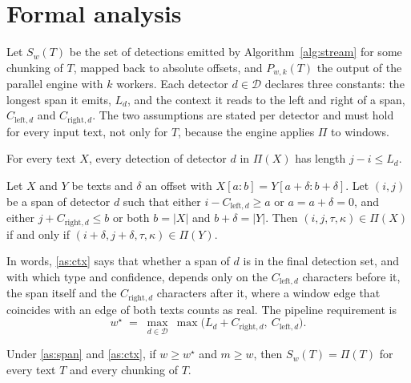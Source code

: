 \section{Formal analysis}\label{sec:formal}

Let $S_w(T)$ be the set of detections emitted by Algorithm~\ref{alg:stream} for some chunking of $T$, mapped back to absolute offsets, and $P_{w,k}(T)$ the output of the parallel engine with $k$ workers. Each detector $d \in \mathcal{D}$ declares three constants: the longest span it emits, $L_d$, and the context it reads to the left and right of a span, $C_{\mathrm{left},d}$ and $C_{\mathrm{right},d}$. The two assumptions are stated per detector and must hold for every input text, not only for $T$, because the engine applies $\Pi$ to windows.

\begin{assumption}\label{as:span}
For every text $X$, every detection of detector $d$ in $\Pi(X)$ has length $j - i \le L_d$.
\end{assumption}

\begin{assumption}\label{as:ctx}
Let $X$ and $Y$ be texts and $\delta$ an offset with $X[a{:}b] = Y[a{+}\delta : b{+}\delta]$. Let $(i, j)$ be a span of detector $d$ such that either $i - C_{\mathrm{left},d} \ge a$ or $a = a + \delta = 0$, and either $j + C_{\mathrm{right},d} \le b$ or both $b = |X|$ and $b + \delta = |Y|$. Then $(i, j, \tau, \kappa) \in \Pi(X)$ if and only if $(i + \delta, j + \delta, \tau, \kappa) \in \Pi(Y)$.
\end{assumption}

In words, \ref{as:ctx} says that whether a span of $d$ is in the final detection set, and with which type and confidence, depends only on the $C_{\mathrm{left},d}$ characters before it, the span itself and the $C_{\mathrm{right},d}$ characters after it, where a window edge that coincides with an edge of both texts counts as real. The pipeline requirement is
\begin{equation}\label{eq:wstar}
w^{\star} \;=\; \max_{d \in \mathcal{D}}\ \max\bigl(L_d + C_{\mathrm{right},d},\ C_{\mathrm{left},d}\bigr).
\end{equation}

\begin{theorem}\label{thm:stream}
Under \ref{as:span} and \ref{as:ctx}, if $w \ge w^{\star}$ and $m \ge w$, then $S_w(T) = \Pi(T)$ for every text $T$ and every chunking of $T$.
\end{theorem}

